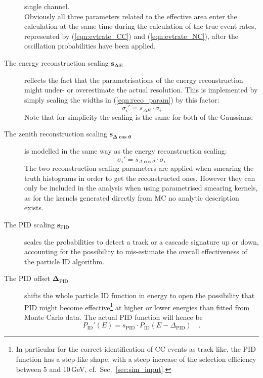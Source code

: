\begin{description}
  single channel.\\
  Obviously all three parameters related to the effective area enter the 
  calculation at the same time during the calculation of the true event rates, 
  represented by (\ref{eqn:evtrate_CC}) and (\ref{eqn:evtrate_NC}), \ie after 
  the oscillation probabilities have been applied.
 \item[The energy reconstruction scaling $\mathbf{s_{\Delta E}}$] reflects the
  fact that the parametrisations of the energy reconstruction might under- or
  overestimate the actual resolution. This is implemented by simply scaling
  the widths in (\ref{eqn:reco_param}) by this factor:
  \begin{equation}
   \sigma_i' = s_{\Delta E}\cdot\sigma_i
  \end{equation}
  Note that for simplicity the scaling is the same for both of the Gaussians.
 \item[The zenith reconstruction scaling $\mathbf{s_{\Delta\cos\vartheta}}$]
  is modelled in the same way as the energy reconstruction scaling:
  \begin{equation}
   \sigma_i' = s_{\Delta\cos\vartheta}\cdot\sigma_i
  \end{equation}
  The two reconstruction scaling parameters are applied when smearing the truth
  histograms in order to get the reconstructed ones. However they can only be
  included in the analysis when using parametrised smearing kernels, as for the
  kernels generated directly from MC no analytic description exists.
 \item[The PID scaling $\mathbf{s_\mathrm{PID}}$] scales the probabilities 
  to detect a track or a cascade signature up or down, accounting for the
  possibility to mis-estimate the overall effectiveness of the particle ID
  algorithm.
 \item[The PID offset $\mathbf{\Delta_\mathrm{PID}}$] shifts the whole particle
  ID function in energy to open the possibility that PID might become
  effective\footnote{In particular for the correct identification of \numu CC
  events as track-like, the PID function has a step-like shape, with a steep
  increase of the selection efficiency between 5 and 10\,GeV, cf.\
  Sec.~\ref{sec:sim_input}.} at higher or lower energies than fitted from
  Monte Carlo data. The actual PID function will hence be
  \begin{equation}
    P_\mathrm{ID}'(E) = s_\mathrm{PID}\cdot P_\mathrm{ID}(E-\Delta_\mathrm{PID})
      \quad.
  \end{equation}
\end{description}

